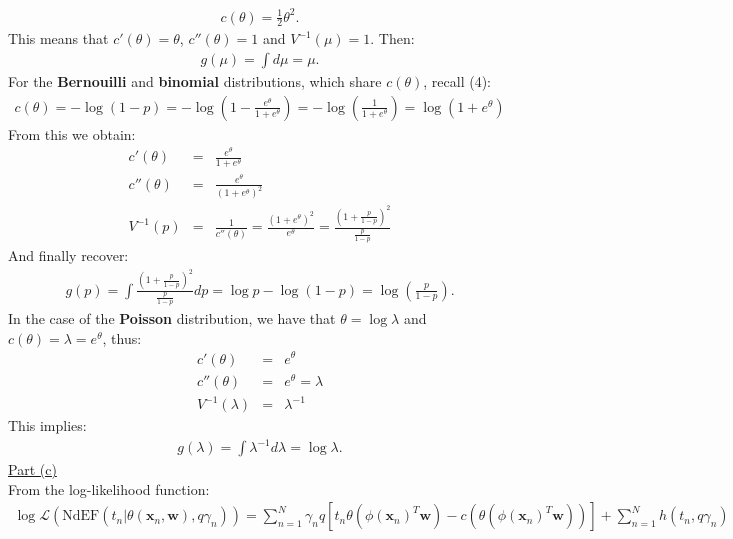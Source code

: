 \documentclass[a4paper, 11pt]{article}
\begin{document}
\begin{eqnarray}
c(\theta) = \frac{1}{2} \theta^2. \nonumber
\end{eqnarray}
This means that $c'(\theta) = \theta$, $c''(\theta) = 1$ and $V^{-1}(\mu) = 1$. Then:
\begin{eqnarray}
g(\mu) = \int d\mu = \mu. \nonumber
\end{eqnarray}
For the \textbf{Bernouilli} and \textbf{binomial} distributions, which share $c(\theta)$, recall (4):
\begin{eqnarray}
c(\theta) = -\log{(1-p)} = -\log{\left( 1 - \frac{e^\theta}{1+e^\theta} \right)} = -\log{\left( \frac{1}{1+e^\theta} \right)} = \log{(1 + e^\theta)} \nonumber
\end{eqnarray}
From this we obtain:
\begin{eqnarray}
c'(\theta) &=& \frac{e^\theta}{1 + e^\theta} \nonumber \\
c''(\theta) &=& \frac{e^\theta}{(1 + e^\theta)^2}\nonumber \\
V^{-1}(p) &=& \frac{1}{c''(\theta)} = \frac{(1 + e^\theta)^2}{e^\theta} = \frac{\left(1 + \frac{p}{1-p}\right)^2}{\frac{p}{1-p}} \nonumber
\end{eqnarray}
And finally recover:
\begin{eqnarray}
g(p) = \int \frac{(1 + \frac{p}{1-p})^2}{\frac{p}{1-p}} dp = \log p - \log{(1-p)} = \log{\left(\frac{p}{1-p}\right)}. \nonumber
\end{eqnarray}
In the case of the \textbf{Poisson} distribution, we have that $\theta = \log \lambda$ and $c(\theta) = \lambda = e^{\theta}$, thus:
\begin{eqnarray}
c'(\theta) &=& e^{\theta} \nonumber \\
c''(\theta) &=& e^{\theta}  = \lambda \nonumber \\
V^{-1}(\lambda) &=& \lambda^{-1} \nonumber
\end{eqnarray}
This implies:
\begin{eqnarray}
g(\lambda) = \int \lambda^{-1} d\lambda = \log \lambda. \nonumber
\end{eqnarray}
\newline \underline{Part (c)}\\
\newline From the log-likelihood function:
\begin{eqnarray}
\log \mathcal{L} \left( \text{NdEF}( t_n | \theta (\mathbf{x}_n, \mathbf{w}), q \gamma_n ) \right) = \sum_{n=1}^{N} \gamma_n q [ t_n \theta( \phi(\mathbf{x}_n)^T \mathbf{w}) - c(\theta(\phi(\mathbf{x}_n)^T \mathbf{w})) ] + \sum_{n=1}^{N} h(t_n, q \gamma_n) \nonumber
\end{eqnarray}
\end{document}
